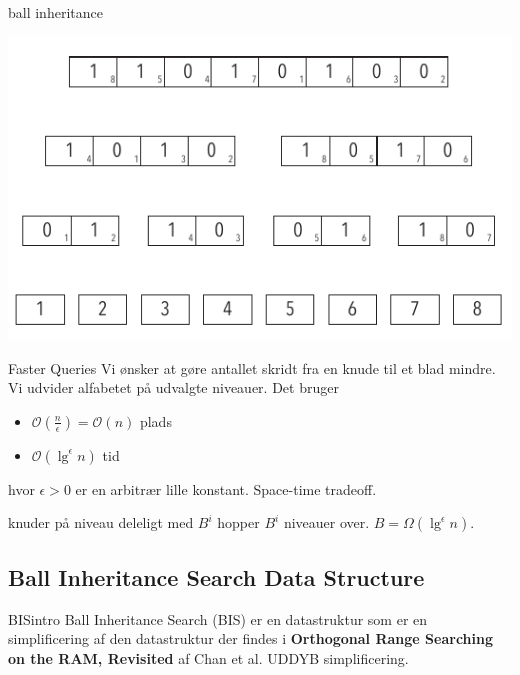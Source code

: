 \documentclass[pdf]{beamer}
\begin{document}
\begin{frame}{ball inheritance}
  \begin{center}
    \includegraphics[scale=1.0]{pictures/uden_bolde_med_tal.pdf}
  \end{center}
\end{frame}



\begin{frame}{Faster Queries}
  Vi ønsker at gøre antallet skridt fra en knude til et blad mindre. Vi udvider alfabetet på udvalgte niveauer.
  Det bruger
  \begin{itemize}
    \item $\mathcal{O}(\frac{n}{\epsilon}) = \mathcal{O}(n)$ plads
    \item $\mathcal{O}(\lg^\epsilon n)$ tid
  \end{itemize}
  hvor $\epsilon > 0$ er en arbitrær lille konstant. Space-time tradeoff.

  knuder på niveau deleligt med $B^i$ hopper $B^i$ niveauer over.
  \pause
  $B = \Omega(\lg^\epsilon n)$.
\end{frame}

\subsection{Ball Inheritance Search Data Structure}

\begin{frame}{BISintro}
  Ball Inheritance Search (BIS) er en datastruktur som er en simplificering af den datastruktur der findes i \textbf{Orthogonal Range Searching on the RAM, Revisited}\cite{chanetal} af Chan et al.
  UDDYB simplificering.

\end{frame}
\end{document}
